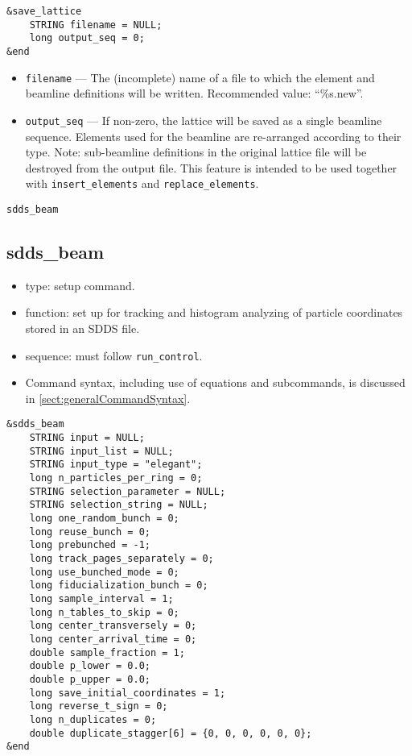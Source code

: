 \documentclass[11pt]{article}
\begin{document}
\begin{verbatim}
&save_lattice
    STRING filename = NULL;
    long output_seq = 0;
&end
\end{verbatim}

\begin{itemize}
\item \verb|filename| --- The (incomplete) name of a file to which the element and beamline definitions
will be written.  Recommended value: ``\%s.new''.
\item \verb|output_seq| --- If non-zero, the lattice will be saved as a single beamline sequence.
Elements used for the beamline are re-arranged according to their type. Note: 
sub-beamline definitions in the original lattice file will be destroyed from the output file.
This feature is intended to be used 
together with \verb|insert_elements| and \verb|replace_elements|. 
\end{itemize}

\newpage
\begin{center}{\Large\verb|sdds_beam|}\end{center}
\subsection{sdds\_beam \label{subsec:sddsbeam}}

\begin{itemize}
\item type: setup command.
\item function: set up for tracking and histogram analyzing of particle coordinates stored in an SDDS file.
\item sequence: must follow \verb|run_control|.
\item Command syntax, including use of equations and subcommands, is discussed in \ref{sect:generalCommandSyntax}.
\end{itemize}

\begin{verbatim}
&sdds_beam
    STRING input = NULL;
    STRING input_list = NULL;
    STRING input_type = "elegant";
    long n_particles_per_ring = 0;
    STRING selection_parameter = NULL;
    STRING selection_string = NULL;
    long one_random_bunch = 0;
    long reuse_bunch = 0;
    long prebunched = -1;
    long track_pages_separately = 0;
    long use_bunched_mode = 0;
    long fiducialization_bunch = 0;
    long sample_interval = 1;
    long n_tables_to_skip = 0;
    long center_transversely = 0;
    long center_arrival_time = 0;
    double sample_fraction = 1;
    double p_lower = 0.0;
    double p_upper = 0.0;
    long save_initial_coordinates = 1;
    long reverse_t_sign = 0;
    long n_duplicates = 0;
    double duplicate_stagger[6] = {0, 0, 0, 0, 0, 0};
&end
\end{verbatim}
\end{document}
